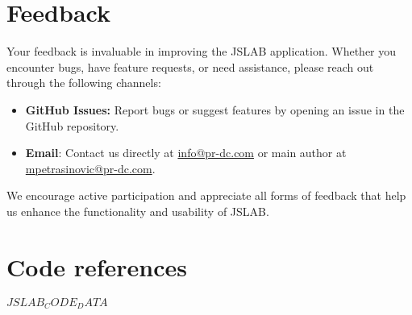 \documentclass[12pt,a4paper]{article}
\begin{document}
\section{Feedback}

Your feedback is invaluable in improving the JSLAB application. Whether you encounter bugs, have feature requests, or need assistance, please reach out through the following channels:

\begin{itemize}
    \item \textbf{GitHub Issues:} Report bugs or suggest features by opening an issue in the GitHub repository.
    
    \item \textbf{Email}: Contact us directly at \href{mailto:info@pr-dc.com}{info@pr-dc.com} or main author at \href{mailto:mpetrasinovic@pr-dc.com}{mpetrasinovic@pr-dc.com}.
\end{itemize}

We encourage active participation and appreciate all forms of feedback that help us enhance the functionality and usability of JSLAB.

\section{Code references}

$JSLAB_CODE_DATA$

\end{document}
